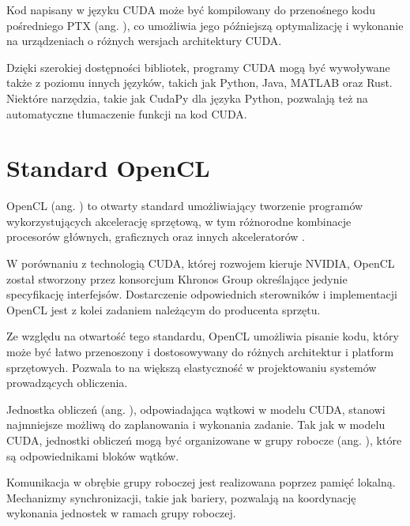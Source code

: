 Kod napisany w języku CUDA może być kompilowany do przenośnego kodu pośredniego PTX
(ang. ), co umożliwia jego późniejszą optymalizację i wykonanie
na urządzeniach o różnych wersjach architektury CUDA.

Dzięki szerokiej dostępności bibliotek, programy CUDA mogą być wywoływane także z poziomu
innych języków, takich jak Python, Java, MATLAB oraz Rust. Niektóre narzędzia, takie jak CudaPy
dla języka Python, pozwalają też na automatyczne tłumaczenie funkcji na kod CUDA.

\section{Standard OpenCL}

OpenCL (ang. ) to otwarty standard umożliwiający tworzenie programów
wykorzystujących akcelerację sprzętową, w tym różnorodne kombinacje procesorów głównych, graficznych oraz
innych akceleratorów \cite{opencl}.

W porównaniu z technologią CUDA, której rozwojem kieruje NVIDIA, OpenCL został stworzony przez konsorcjum
Khronos Group określające jedynie specyfikację interfejsów. Dostarczenie odpowiednich sterowników i
implementacji OpenCL jest z kolei zadaniem należącym do producenta sprzętu.

Ze względu na otwartość tego standardu, OpenCL umożliwia pisanie kodu, który może być łatwo przenoszony i
dostosowywany do różnych architektur i platform sprzętowych. Pozwala to na większą elastyczność w projektowaniu
systemów prowadzących obliczenia.

Jednostka obliczeń (ang. ), odpowiadająca wątkowi w modelu CUDA, stanowi najmniejsze
możliwą do zaplanowania i wykonania zadanie. Tak jak w modelu CUDA, jednostki obliczeń mogą być organizowane
w grupy robocze (ang. ), które są odpowiednikami bloków wątków. 

Komunikacja w obrębie grupy roboczej jest realizowana poprzez pamięć lokalną. Mechanizmy synchronizacji, takie jak bariery, pozwalają
na koordynację wykonania jednostek w ramach grupy roboczej.

